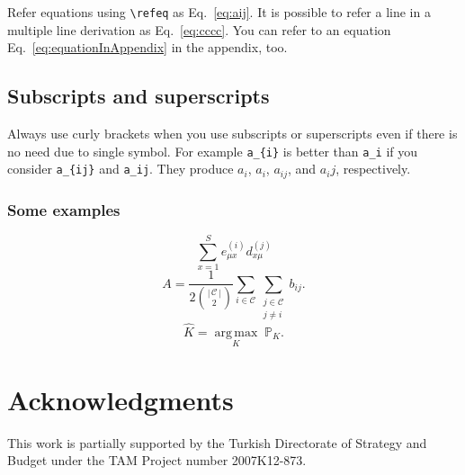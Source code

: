 \documentclass[10pt,journal,compsoc]{IEEEtran}
\newcommand{\refeq}[1]{Eq.~\ref{#1}}
\newcommand{\hAbs}[1]{\ensuremath{\left \lvert \, #1 \, \right \rvert} } %
\newcommand{\hArgmax}[2]{\underset{#1}{\operatorname{arg \, max}}\;#2}
\theoremstyle{plain}
\theoremstyle{definition}
\theoremstyle{remark}
\begin{document}
{Refer equations using \verb!\refeq! as \refeq{eq:aij}.
It is possible to refer a line in a multiple line derivation as \refeq{eq:cccc}.
You can refer to an equation \refeq{eq:equationInAppendix} in the appendix, too.




\subsection{Subscripts and superscripts}

Always use curly brackets when you use subscripts or superscripts 
even if there is no need due to single symbol.
For example \verb!a_{i}! is better than \verb!a_i! 
if you consider
\verb!a_{ij}! and \verb!a_ij!.
They produce
$a_{i}$,
$a_i$,
$a_{ij}$, and 
$a_ij$,
respectively.




\subsubsection{Some examples}

\[
	\sum_{x = 1}^{S} 
		e_{\mu x}^{(i)}
		d_{x \mu}^{(j)} 
\]
\[
	A= 	
	\frac
		{1}
		{2 {\hAbs{\mathcal{C}} \choose 2}} 
	\sum_{i \in \mathcal{C}}
	\sum_{
		\substack{
			j \in \mathcal{C}\\
			j \neq i
		}
	} 
	b_{ij}.
\]
\[
	\hat{K} =
		\hArgmax
			{K}
			{{\mathbb{P}_{K}}}.
\]




\section*{Acknowledgments}

This work is partially supported by 
the Turkish Directorate of Strategy and Budget
under the TAM Project number 2007K12-873.





\appendix
\newcommand{\hbAppendixPrefix}{A}
%
\renewcommand{\thefigure}{\hbAppendixPrefix\arabic{figure}}
\setcounter{figure}{0}
\renewcommand{\thetable}{\hbAppendixPrefix\arabic{table}} 
\setcounter{table}{0}
\renewcommand{\theequation}{\hbAppendixPrefix\arabic{equation}} 
\setcounter{equation}{0}




}
\end{document}
